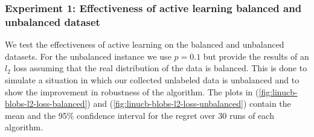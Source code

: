 \documentclass{article}
\begin{document}
\subsubsection{Experiment 1: Effectiveness of active learning balanced and unbalanced dataset}
We test the effectiveness of active learning on the balanced and unbalanced datasets.
For the unbalanced instance we use $p = 0.1$ but provide the results of an $l_2$ loss assuming that the real distribution of the data is balanced.
This is done to simulate a situation in which our collected unlabeled data is unbalanced and to show the improvement in robustness of the
algorithm. The plots in (\ref{fig:linucb-blobs-l2-loss-balanced}) and (\ref{fig:linucb-blobs-l2-loss-unbalanced})  contain the mean and the 95\% confidence interval for the
regret over 30 runs of each algorithm.
\end{document}
